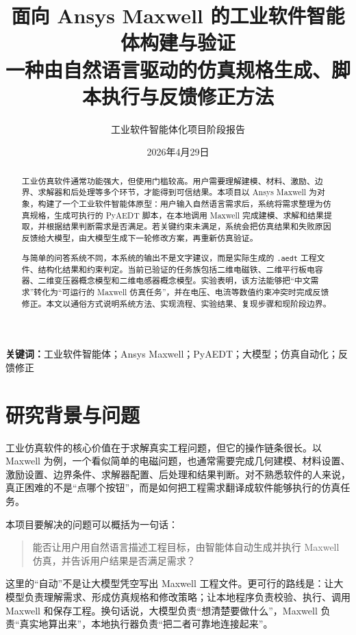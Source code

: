 \documentclass[12pt,a4paper]{ctexart}
\title{\textbf{面向 Ansys Maxwell 的工业软件智能体构建与验证}\\
\large 一种由自然语言驱动的仿真规格生成、脚本执行与反馈修正方法}
\author{工业软件智能体化项目阶段报告}
\date{2026年4月29日}
\begin{document}
\maketitle

\begin{abstract}
工业仿真软件通常功能强大，但使用门槛较高。用户需要理解建模、材料、激励、边界、求解器和后处理等多个环节，才能得到可信结果。本项目以 Ansys Maxwell 为对象，构建了一个工业软件智能体原型：用户输入自然语言需求后，系统将需求整理为仿真规格，生成可执行的 PyAEDT 脚本，在本地调用 Maxwell 完成建模、求解和结果提取，并根据结果判断需求是否满足。若关键约束未满足，系统会把仿真结果和失败原因反馈给大模型，由大模型生成下一轮修改方案，再重新仿真验证。

与简单的问答系统不同，本系统的输出不是文字建议，而是实际生成的 \texttt{.aedt} 工程文件、结构化结果和约束判定。当前已验证的任务族包括二维电磁铁、二维平行板电容器、二维变压器概念模型和二维电感器概念模型。实验表明，该方法能够把“中文需求”转化为“可运行的 Maxwell 仿真任务”，并在电压、电流等数值约束冲突时完成反馈修正。本文以通俗方式说明系统方法、实现流程、实验结果、复现步骤和现阶段边界。
\end{abstract}

\noindent\textbf{关键词：}工业软件智能体；Ansys Maxwell；PyAEDT；大模型；仿真自动化；反馈修正

\newpage
\tableofcontents
\newpage

\section{研究背景与问题}

工业仿真软件的核心价值在于求解真实工程问题，但它的操作链条很长。以 Maxwell 为例，一个看似简单的电磁问题，也通常需要完成几何建模、材料设置、激励设置、边界条件、求解器配置、后处理和结果判断。对不熟悉软件的人来说，真正困难的不是“点哪个按钮”，而是如何把工程需求翻译成软件能够执行的仿真任务。

本项目要解决的问题可以概括为一句话：

\begin{quote}
能否让用户用自然语言描述工程目标，由智能体自动生成并执行 Maxwell 仿真，并告诉用户结果是否满足需求？
\end{quote}

这里的“自动”不是让大模型凭空写出 Maxwell 工程文件。更可行的路线是：让大模型负责理解需求、形成仿真规格和修改策略；让本地程序负责校验、执行、调用 Maxwell 和保存工程。换句话说，大模型负责“想清楚要做什么”，Maxwell 负责“真实地算出来”，本地执行器负责“把二者可靠地连接起来”。
\end{document}
